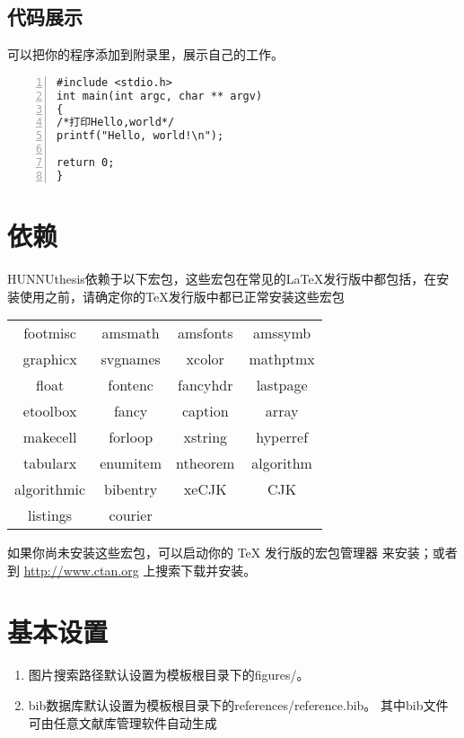 \subsection{代码展示}
可以把你的程序添加到附录里，展示自己的工作。
\begin{lstlisting}[language={[ANSI]C}, numbers=left]
#include <stdio.h>
int main(int argc, char ** argv)
{
/*打印Hello,world*/
printf("Hello, world!\n");

return 0;
}
\end{lstlisting}
\section{依赖}
HUNNUthesis依赖于以下宏包，这些宏包在常见的\LaTeX{}发行版中都包括，在安装使用之前，请确定你的\TeX{}发行版中都已正常安装这些宏包
\begin{table}[H]
	\centering
	\begin{tabular}{cccc}
		\hline
		{footmisc} &  {amsmath} &  {amsfonts} &  {amssymb} \\
		
		{graphicx} &  {svgnames} &  {xcolor} &  {mathptmx} \\
		
		{float} &  {fontenc} &  {fancyhdr} &  {lastpage} \\
		
		{etoolbox} &  {fancy} &  {caption} &  {array} \\
		
		{makecell} &  {forloop} &  {xstring} &  {hyperref} \\
		
		{tabularx} &  {enumitem} &  {ntheorem} &  {algorithm}\\
		
		{algorithmic} &  {bibentry} &  {xeCJK} &  {CJK} \\
		{listings} &  {courier} &  {} &  {} \\
		\hline
	\end{tabular}
\end{table}
如果你尚未安装这些宏包，可以启动你的 \TeX{} 发行版的宏包管理器
来安装；或者到 \url{http://www.ctan.org} 上搜索下载并安装。
\section{基本设置}
\begin{enumerate}
	\item 图片搜索路径默认设置为模板根目录下的figures/。
	\item bib数据库默认设置为模板根目录下的references/reference.bib。 其中bib文件可由任意文献库管理软件自动生成
\end{enumerate}

